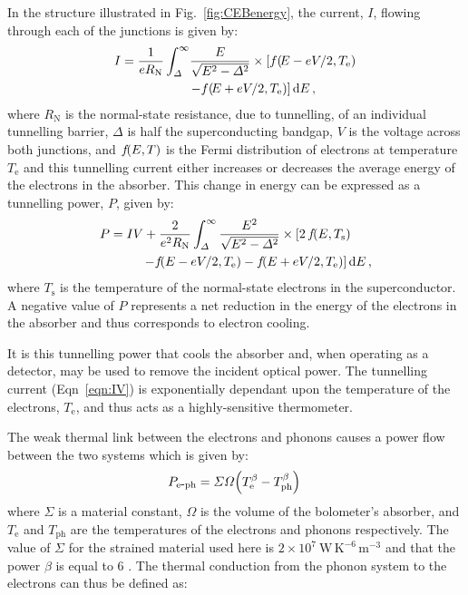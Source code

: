 \documentclass[journal, a4paper]{IEEEtran}
\let\originalleft\left
\let\originalright\right
\renewcommand{\left}{\mathopen{}\mathclose\bgroup\originalleft}
\renewcommand{\right}{\aftergroup\egroup\originalright}
\begin{document}
 \par 	
In the structure illustrated in Fig.~\ref{fig:CEBenergy}, the current, $I$, flowing through each of the junctions is given by:
\begin{align}
I = \frac{1}{eR_{\mathrm{N}}}\int^{\infty}_{\varDelta} 
	&\frac{E}{\sqrt{E^{2}-\varDelta^{2}}} \times 
	\left[f\left(\!E-eV/2,T_{\mathrm{e}}\right)\right. \nonumber \\
	&\left. - f\left(\!E+eV/2,T_{\mathrm{e}}\right)\right]\,\mathrm{d}E\,,
	\label{eqn:IV}
\end{align}
where $R_{\mathrm{N}}$ is the normal-state resistance, due to tunnelling, of an individual tunnelling barrier, $\varDelta$ is half the superconducting bandgap, $V$ is the voltage across both junctions, and $f\!\left(E,T\right)$ is the Fermi distribution of electrons at temperature $T_{\mathrm{e}}$ and this tunnelling current either increases or decreases the average energy of the electrons in the absorber. This change in energy can be expressed as a tunnelling power, $P$, given by:
\begin{align}
P = IV &+\frac{2}{e^{2}R_{\mathrm{N}}}\int^{\infty}_{\varDelta}\frac{E^{2}}
	{\sqrt{E^{2}-\varDelta^{2}}} \times \left[2\,f\!\left(E,T_{\mathrm{s}}\right)
	\right.\nonumber \\
	&\left. - f\!\left(E-eV/2,T_{\mathrm{e}}\right)
	- f\!\left(E+eV/2,T_{\mathrm{e}}\right)\right]\,\mathrm{d}E\,,
	\label{eqn:Ptun}
\end{align}
where $T_{\mathrm{s}}$ is the temperature of the normal-state electrons in the superconductor. A negative value of $P$ represents a net reduction in the energy of the electrons in the absorber and thus corresponds to electron cooling.
\par 
It is this tunnelling power that cools the absorber and, when operating as a detector, may be used to remove the incident optical power. The tunnelling current (Eqn~\ref{eqn:IV}) is exponentially dependant upon the temperature of the electrons, $T_{\mathrm{e}}$, and thus acts as a highly-sensitive thermometer.
\par 
The weak thermal link between the electrons and phonons causes a power flow between the two systems which is given by:
\begin{align}
P_{\mathrm{e\mbox{-}ph}} = \varSigma\varOmega
	\left(T_{\mathrm{e}}^{\beta} - T_{\mathrm{ph}}^{\beta}\right)\,
\end{align}
where $\varSigma$ is a material constant, $\varOmega$ is the volume of the bolometer's absorber, and $T_{\mathrm{e}}$ and $T_{\mathrm{ph}}$ are the temperatures of the electrons and phonons respectively. The value of $\varSigma$ for the strained material used here is $2 \times 10^{7}~\mathrm{W\,K^{-6}\,m^{-3}}$ and that the power $\beta$ is equal to $6$ \cite{Muhonen2011,Prest2011}. The thermal conduction from the phonon system to the electrons can thus be defined as:
\end{document}
